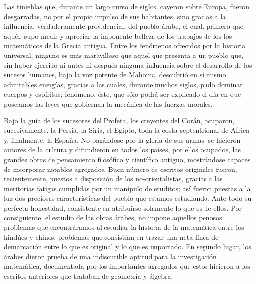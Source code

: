 \documentclass[a4paper, 12pt, draft]{article}
\begin{document}
{%

Las tinieblas que, durante un largo curso de siglos, cayeron sobre Europa, fueron desgarradas, no por el propio impulso de sus habitantes, sino gracias
a la influencia, verdaderamente providencial, del pueblo árabe, el cual, primero que aquél, supo medir y apreciar la imponente belleza de los trabajos de los 
los	matemáticos de la Grecia antigua.
Entre los fenómenos ofrecidos por la historia universal, ninguno es más maravilloso que aquel que presenta a un pueblo que, sin haber ejercido ni antes ni después ninguna influencia sobre el desarrollo de los sucesos humanos, bajo la voz potente de Mahoma, descubrió en sí mismo admirables energías, gracias a las cuales, durante muchos siglos, pudo dominar cuerpos y espíritus; fenómeno, éste, que sólo podrá ser explicado el día en que poseamos las leyes que gobiernan la mecánica de las fuerzas morales.

Bajo la guía de los sucesores del Profeta, los creyentes del Corán, ocuparon, sucesivamente, la Persia, la Siria, el Egipto, toda la costa septentrional de Africa y, finalmente, la España. No pagándose por la gloria de sus armas, se hicieron autores de la cultura y difundieron en todos los países, por ellos ocupados, las grandes obras de pensamiento filosófico y científico antiguo, mostrándose capaces de incorporar notables agregados. Buen número de escritos originales fueron, recientemente, puestos a disposición de los no-orientalistas, gracias a las meritorias fatigas cumplidas por un manípulo de eruditos; así fueron puestas a la luz dos preciosas características del pueblo que estamos estudiando. Ante todo su perfecta honestidad, consistente en atribuirse solamente lo que es de ellos. Por consiguiente, el estudio de las obras árabes, no impone aquellos penosos problemas que encontráramos al estudiar la historia de la matemática entre los hindúes y chinos, problemas que consistían en trazar una neta línea de demarcación entre lo que es original y lo que es importado. En segundo lugar, los árabes dieron prueba de una indiscutible aptitud para la investigación matemática, documentada por los importantes agregados que estos hicieron a los escritos anteriores que trataban de geometría y álgebra.


}
\end{document}

